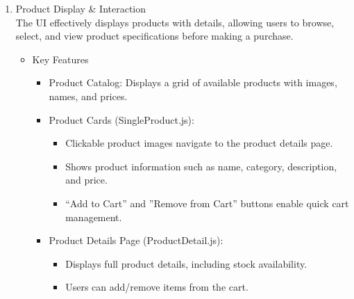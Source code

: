 \documentclass{llncs}
\begin{document}
\begin{enumerate}
        \item Product Display \& Interaction \\
        The UI effectively displays products with details, allowing users to browse, select, and view product specifications before making a purchase.
            \begin{itemize}
                \item Key Features 
                \begin{itemize}
                    \item Product Catalog: Displays a grid of available products with images, names, and prices.
                    \item Product Cards (SingleProduct.js):
                    \begin{itemize}
                        \item Clickable product images navigate to the product details page.
                        \item Shows product information such as name, category, description, and price.
                        \item ``Add to Cart'' and ''Remove from Cart'' buttons enable quick cart management.
                    \end{itemize}
                    \item Product Details Page (ProductDetail.js):
                    \begin{itemize}
                        \item Displays full product details, including stock availability.
                        \item Users can add/remove items from the cart.\\
    
                    \end{itemize}
                \end{itemize}
            \end{itemize}


\end{enumerate}
\end{document}
